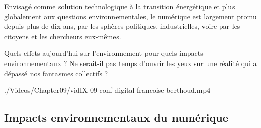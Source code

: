 \begin{tcolorbox}[title={Résumé de l'intervention}, toprule=0pt, leftrule=0pt, rightrule=0pt, arc=0pt,
                  fonttitle=\scshape\boxtitlefont,
                  colbacktitle=white, coltitle=fourthcolor, colframe=fourthcolor, colback=fourthcolor!10,
                  breakable, enhanced jigsaw]
Envisagé comme solution technologique à la transition énergétique et plus globalement aux questions environnementales, le numérique est largement promu depuis plus de dix ans, par les sphères politiques, industrielles, voire par les citoyens et les chercheurs eux-mêmes. 

Quels effets aujourd’hui sur l’environnement pour quels impacts environnementaux ? Ne serait-il pas temps d’ouvrir les yeux sur une réalité qui a dépassé nos fantasmes collectifs ?
\end{tcolorbox}

\begin{marginvideo}
		{./Videos/Chapter09/vidIX-09-conf-digital-francoise-berthoud.mp4}%
\end{marginvideo}


\subsection[Impacts environnementaux]{Impacts environnementaux du numérique}
\label{sub:IX.4.2}

